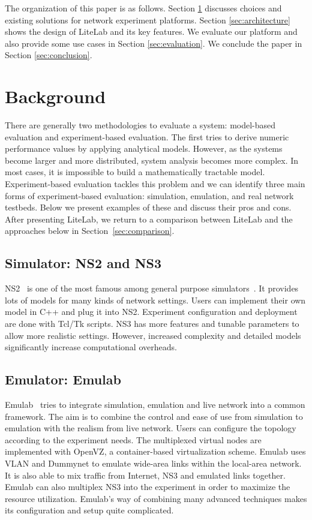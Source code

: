 \documentclass[conference]{IEEEtran}
\begin{document}
The organization of this paper is as follows. Section
\ref{sec:background} discusses choices and existing solutions for
network experiment platforms. Section \ref{sec:architecture} shows the
design of LiteLab and its key features. We evaluate our platform and
also provide some use cases in Section \ref{sec:evaluation}. We
conclude the paper in Section \ref{sec:conclusion}.




\section{Background}
\label{sec:background}

There are generally two methodologies to evaluate a system:
model-based evaluation and experiment-based evaluation. The first
tries to derive numeric performance values by applying analytical
models. However, as the systems become larger and more distributed,
system analysis becomes more complex. In most cases, it is impossible
to build a mathematically tractable model. Experiment-based evaluation
tackles this problem and we can identify three main forms of
experiment-based evaluation: simulation, emulation, and real network
testbeds. Below we present examples of these and discuss their pros
and cons. After presenting LiteLab, we return to a comparison between
LiteLab and the approaches below in Section~\ref{sec:comparison}.






\subsection{Simulator: NS2 and NS3}
\label{sec:background:simulator}
NS2~\cite{NS} is one of the most famous among general purpose
simulators~\cite{NS, disa2:omnet}.  It provides lots of models for
many kinds of network settings. Users can implement their own model in
C++ and plug it into NS2. Experiment configuration and deployment are
done with Tcl/Tk scripts.
NS3 has more features and tunable parameters to allow more realistic
settings. However, increased complexity and detailed models
significantly increase computational overheads.


\subsection{Emulator: Emulab}
Emulab~\cite{White:osdi02} tries to integrate simulation, emulation
and live network into a common framework. The aim is to combine the
control and ease of use from simulation to emulation with the realism
from live network. Users can configure the topology according to the
experiment needs. The multiplexed virtual nodes are implemented with
OpenVZ, a container-based virtualization scheme. Emulab uses VLAN and
Dummynet\cite{Rizzo:1997:DSA:251007.251012} to emulate wide-area links
within the local-area network. It is also able to mix traffic from
Internet, NS3 and emulated links together.  Emulab can also multiplex
NS3 into the experiment in order to maximize the resource utilization.
Emulab's way of combining many advanced techniques makes its
configuration and setup quite complicated. 
\end{document}
